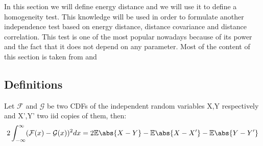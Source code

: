
In this section we will define energy distance and we will use it to define a homogeneity test.
This knowledge will be used in order to formulate another independence test based on energy distance, distance covariance and distance correlation. This test is one of the most popular nowadays because of its power and the fact that it does not depend on any parameter. Most of the content of this section is taken from \cite{DCOV_1} and \cite{BrownianCovariance}

\subsection{Definitions}

\begin{prop}
Let $\mathcal{F}$ and $\mathcal{G}$ be two CDFs of the independent random variables X,Y respectively and  X',Y' two iid copies of them, then:
\vspace{5mm}
$$
2\int_{-\infty}^{\infty}(\mathcal{F}(x) - \mathcal{G}(x))^{2} dx = 2\mathbb{E}\abs{X-Y} - \mathbb{E}\abs{X-X'} -\mathbb{E}\abs{Y-Y'}  
$$
\end{prop}
